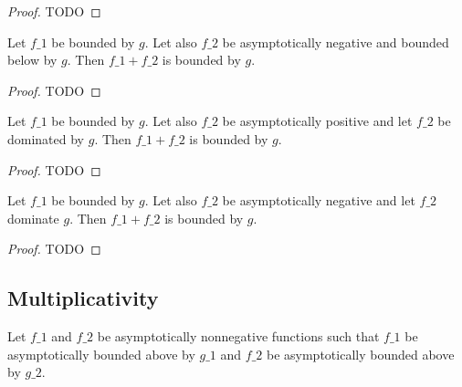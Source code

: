 \begin{proof}
    \leanok
    TODO
\end{proof}

\begin{lemma}
    \label{lemma:asymp_bounded_add_neg_below}
    \leanok
    Let $f\_1$ be bounded by $g$. Let also $f\_2$ be asymptotically negative and
    bounded below by $g$. Then $f\_1 + f\_2$ is bounded by $g$.
\end{lemma}

\begin{proof}
    \leanok
    TODO
\end{proof}

\begin{lemma}
    \label{lemma:asymp_bounded_add_pos_right_dom}
    \leanok
    Let $f\_1$ be bounded by $g$. Let also $f\_2$ be asymptotically positive and
    let $f\_2$ be dominated by $g$. Then $f\_1 + f\_2$ is bounded by $g$.
\end{lemma}

\begin{proof}
    \leanok
    TODO
\end{proof}

\begin{lemma}
    \label{lemma:asymp_bounded_add_neg_left_dom}
    \leanok
    Let $f\_1$ be bounded by $g$. Let also $f\_2$ be asymptotically negative and
    let $f\_2$ dominate $g$. Then $f\_1 + f\_2$ is bounded by $g$.
\end{lemma}

\begin{proof}
    \leanok
    TODO
\end{proof}


\subsection{Multiplicativity}

\begin{lemma}
    \label{lemma:asymp_bounded_above_nonneg_mul}
    \leanok
    Let $f\_1$ and $f\_2$ be asymptotically nonnegative functions such that $f\_1$ 
    be asymptotically bounded above by $g\_1$ and $f\_2$ be asymptotically bounded 
    above by $g\_2$. 
\end{lemma}

